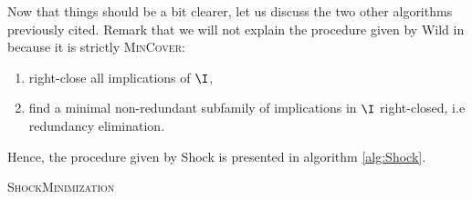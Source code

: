 \vspace{1.2em}

Now that things should be a bit clearer, let us discuss the two other 
algorithms previously cited. Remark that we will not explain the procedure
given by Wild in \cite{wild_implicational_1989, wild_theory_1994} because it
is strictly \textsc{MinCover}:
\begin{enumerate}
	\item right-close all implications of $\I$,
	\item find a minimal non-redundant subfamily of implications in $\I$
	right-closed, i.e redundancy elimination. 
\end{enumerate}
\noindent Hence, the procedure given by Shock is presented in algorithm 
\ref{alg:Shock}.

\begin{algorithm}
	
	\BlankLine
	\BlankLine
	
	\caption{\textsc{ShockMinimization}}
	\label{alg:Shock}
\end{algorithm}

